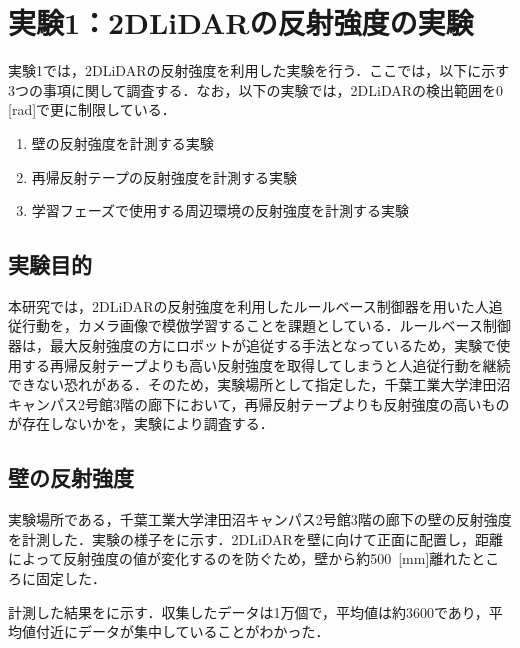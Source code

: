 
\section{実験1：2DLiDARの反射強度の実験}

  実験1では，2DLiDARの反射強度を利用した実験を行う．ここでは，以下に示す3つの事項に関して調査する．なお，以下の実験では，2DLiDARの検出範囲を0 \,[rad]で更に制限している．

  \begin{enumerate}
    \item 壁の反射強度を計測する実験
    \item 再帰反射テープの反射強度を計測する実験
    \item 学習フェーズで使用する周辺環境の反射強度を計測する実験
  \end{enumerate}

\subsection{実験目的}

本研究では，2DLiDARの反射強度を利用したルールベース制御器を用いた人追従行動を，カメラ画像で模倣学習することを課題としている．ルールベース制御器は，最大反射強度の方にロボットが追従する手法となっているため，実験で使用する再帰反射テープよりも高い反射強度を取得してしまうと人追従行動を継続できない恐れがある．そのため，実験場所として指定した，千葉工業大学津田沼キャンパス2号館3階の廊下において，再帰反射テープよりも反射強度の高いものが存在しないかを，実験により調査する．

\newpage

\subsection{壁の反射強度}

  実験場所である，千葉工業大学津田沼キャンパス2号館3階の廊下の壁の反射強度を計測した．実験の様子をに示す．2DLiDARを壁に向けて正面に配置し，距離によって反射強度の値が変化するのを防ぐため，壁から約500 \,[mm]離れたところに固定した．
  
  計測した結果をに示す．収集したデータは1万個で，平均値は約3600であり，平均値付近にデータが集中していることがわかった．

